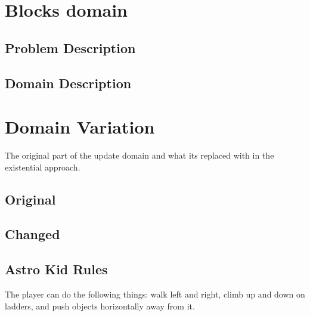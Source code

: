 \begin{appendices}
\lstset{tabsize=2}


\section{Blocks domain}\label{blocks}
\subsection{Problem Description}\label{blocks-prob}

\subsection{Domain Description}\label{blocks-domain}



\section{Domain Variation}\label{Domain_Variation}
The original part of the update domain and what its replaced with in the existential approach.
\subsection{Original}\label{domain}

\subsection{Changed}\label{domain2}


\subsection{Astro Kid Rules}

The player can do the following things: walk left and right, climb up and down on ladders, and push objects horizontally away from it.

\end{appendices}